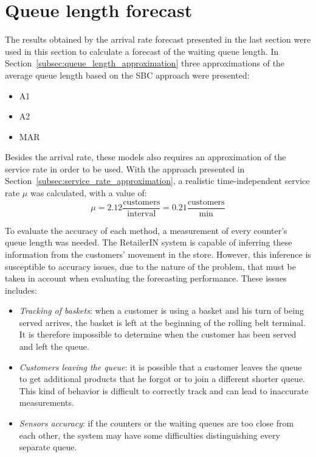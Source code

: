 \section{Queue length forecast}
\label{sec:queue_length_forecast_results}

The results obtained by the arrival rate forecast presented in the last section were used in this section to calculate a forecast of the waiting queue length. In Section~\ref{subsec:queue_length_approximation} three approximations of the average queue length based on the SBC approach were presented:
\begin{itemize}
  \item A1
  \item A2
  \item MAR
\end{itemize}

Besides the arrival rate, these models also requires an approximation of the service rate in order to be used. With the approach presented in Section~\ref{subsec:service_rate_approximation}, a realistic time-independent service rate \( \mu \) was calculated, with a value of:
\[
  \mu = 2.12 \frac{\text{customers}}{\text{interval}} = 0.21 \frac{\text{customers}}{\text{min}}
\]

To evaluate the accuracy of each method, a measurement of every counter’s queue length was needed. The RetailerIN system is capable of inferring these information from the customers’ movement in the store. However, this inference is susceptible to accuracy issues, due to the nature of the problem, that must be taken in account when evaluating the forecasting performance. These issues includes:
\begin{itemize}
  \item \emph{Tracking of baskets}: when a customer is using a basket and his turn of being served arrives, the basket is left at the beginning of the rolling belt terminal. It is therefore impossible to determine when the customer has been served and left the queue.
  \item \emph{Customers leaving the queue}: it is possible that a customer leaves the queue to get additional products that he forgot or to join a different shorter queue. This kind of behavior is difficult to correctly track and can lead to inaccurate measurements.
  \item \emph{Sensors accuracy}: if the counters or the waiting queues are too close from each other, the system may have some difficulties distinguishing every separate queue.
\end{itemize}

